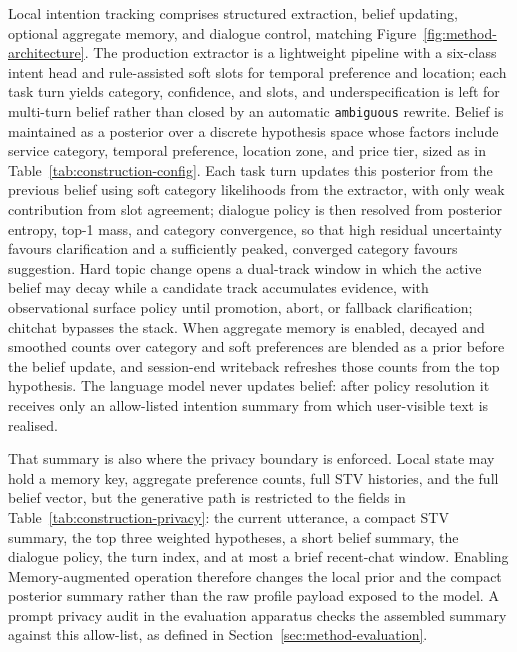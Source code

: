 Local intention tracking comprises structured extraction, belief updating, optional aggregate memory, and dialogue control, matching Figure~\ref{fig:method-architecture}.
The production extractor is a lightweight pipeline with a six-class intent head and rule-assisted soft slots for temporal preference and location; each task turn yields category, confidence, and slots, and underspecification is left for multi-turn belief rather than closed by an automatic \texttt{ambiguous} rewrite.
Belief is maintained as a posterior over a discrete hypothesis space whose factors include service category, temporal preference, location zone, and price tier, sized as in Table~\ref{tab:construction-config}.
Each task turn updates this posterior from the previous belief using soft category likelihoods from the extractor, with only weak contribution from slot agreement; dialogue policy is then resolved from posterior entropy, top-1 mass, and category convergence, so that high residual uncertainty favours clarification and a sufficiently peaked, converged category favours suggestion.
Hard topic change opens a dual-track window in which the active belief may decay while a candidate track accumulates evidence, with observational surface policy until promotion, abort, or fallback clarification; chitchat bypasses the stack.
When aggregate memory is enabled, decayed and smoothed counts over category and soft preferences are blended as a prior before the belief update, and session-end writeback refreshes those counts from the top hypothesis.
The language model never updates belief: after policy resolution it receives only an allow-listed intention summary from which user-visible text is realised.

That summary is also where the privacy boundary is enforced.
Local state may hold a memory key, aggregate preference counts, full STV histories, and the full belief vector, but the generative path is restricted to the fields in Table~\ref{tab:construction-privacy}: the current utterance, a compact STV summary, the top three weighted hypotheses, a short belief summary, the dialogue policy, the turn index, and at most a brief recent-chat window.
Enabling Memory-augmented operation therefore changes the local prior and the compact posterior summary rather than the raw profile payload exposed to the model.
A prompt privacy audit in the evaluation apparatus checks the assembled summary against this allow-list, as defined in Section~\ref{sec:method-evaluation}.


